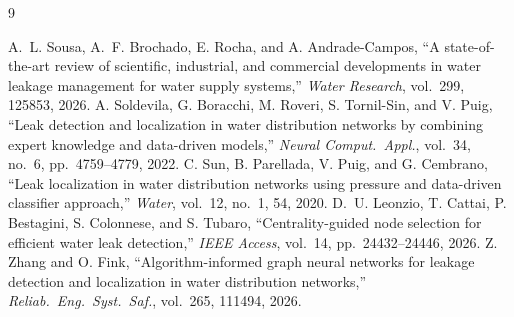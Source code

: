 \documentclass[11pt,a4paper]{article}
\begin{document}
\begingroup\footnotesize
\begin{thebibliography}{9}
\raggedright
{} A.~L. Sousa, A.~F. Brochado, E. Rocha, and A. Andrade-Campos, ``A state-of-the-art review of scientific, industrial, and commercial developments in water leakage management for water supply systems,'' \emph{Water Research}, vol.~299, 125853, 2026.
 A. Soldevila, G. Boracchi, M. Roveri, S. Tornil-Sin, and V. Puig, ``Leak detection and localization in water distribution networks by combining expert knowledge and data-driven models,'' \emph{Neural Comput.\ Appl.}, vol.~34, no.~6, pp.~4759--4779, 2022.
 C. Sun, B. Parellada, V. Puig, and G. Cembrano, ``Leak localization in water distribution networks using pressure and data-driven classifier approach,'' \emph{Water}, vol.~12, no.~1, 54, 2020.
 D.~U. Leonzio, T. Cattai, P. Bestagini, S. Colonnese, and S. Tubaro, ``Centrality-guided node selection for efficient water leak detection,'' \emph{IEEE Access}, vol.~14, pp.~24432--24446, 2026.
 Z. Zhang and O. Fink, ``Algorithm-informed graph neural networks for leakage detection and localization in water distribution networks,'' \emph{Reliab.\ Eng.\ Syst.\ Saf.}, vol.~265, 111494, 2026.
\end{thebibliography}
\endgroup
\end{document}
